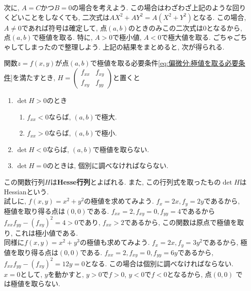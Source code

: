         次に, $A=C$かつ$B=0$の場合を考えよう. この場合はわざわざ上記のような回りくどいことをしなくても, 二次式は$AX^2+AY^2=A(X^2+Y^2)$となる.
        この場合, $A\neq 0$であれば符号は確定して, 点$(a,b)$のときのみこの二次式は0となるから, 点$(a,b)$で極値を取る. 特に, $A>0$で極小値, $A<0$で極大値を取る.
        \clearpage
        ごちゃごちゃしてしまったので整理しよう. 上記の結果をまとめると, 次が得られる.
        \begin{screen}
            関数$z=f(x,y)$が点$(a,b)$で極値を取る必要条件\eqref{eq:偏微分:極値を取る必要条件}を満たすとき, $H=\begin{pmatrix}f_{xx}&f_{xy}\\f_{xy}&f_{yy}\end{pmatrix}$と置くと
            \begin{enumerate}\renewcommand{\theenumi}{\roman{enumi}}\renewcommand{\labelenumi}{(\theenumi)}
                \item $\det H > 0$のとき
                \begin{enumerate}
                    \item $f_{xx}<0$ならば, $(a,b)$で極大.
                    \item $f_{xx}>0$ならば, $(a,b)$で極小.
                \end{enumerate}
                \item $\det H < 0$ならば, $(a,b)$で極値を取らない.
                \item $\det H = 0$のときは, 個別に調べなければならない.
            \end{enumerate}
        \end{screen}
        この関数行列$H$は\textbf{Hesse行列}とよばれる. また, この行列式を取ったもの$\det H$はHessianという.\\

        試しに, $f(x,y)=x^2+y^2$の極値を求めてみよう. $f_x=2x,f_y=2y$であるから, 極値を取り得る点は$(0,0)$である. $f_{xx}=2,f_{xy}=0,f_{yy}=4$であるから
        $f_{xx}f_{yy}-(f_{xy})^2=4>0$であり, $f_{xx}>2$であるから, この関数は原点で極値を取り, これは極小値である.\\
        同様に$f(x,y)=x^2+y^3$の極値も求めてみよう. $f_{x}=2x,f_{y}=3y^2$であるから, 極値を取り得る点は$(0,0)$である. $f_{xx}=2,f_{xy}=0,f_{yy}=6y$であるから, 
        $f_{xx}f_{yy}-(f_{xy})^{2}=12y=0$となる. この場合は個別に調べなければならない. $x=0$として, $y$を動かすと, $y>0$で$f>0$, $y<0$で$f<0$となるから, 点$(0,0)$
        では極値を取らない.\\

